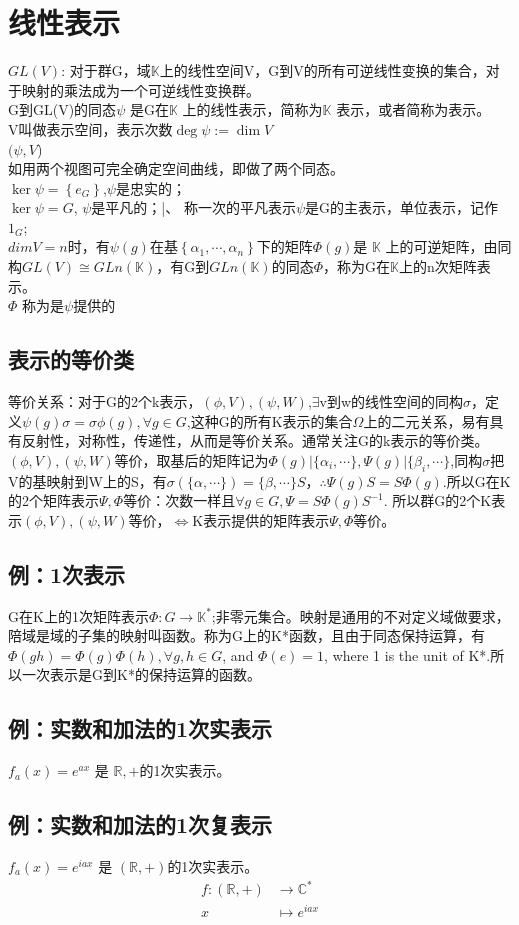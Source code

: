 \documentclass[UTF8]{article}
\begin{document}
\section{线性表示}
$GL(V)$: 对于群G，域$\mathbb K$上的线性空间V，G到V的所有可逆线性变换的集合，对于映射的乘法成为一个可逆线性变换群。\\
G到GL(V)的同态$\psi $ 是G在$\mathbb K$ 上的线性表示，简称为$\mathbb K$ 表示，或者简称为表示。\\
V叫做表示空间，表示次数$\deg \psi := \dim V$\\
$(\psi ,V$)\\
如用两个视图可完全确定空间曲线，即做了两个同态。\\
$\ker \psi =\left\{ e_G \right\}$,$\psi $是忠实的；\\
$\ker \psi =G$, $\psi$是平凡的；|、
称一次的平凡表示$\psi $是G的主表示，单位表示，记作$1_G$;\\
$dimV=n$时，有$\psi (g)$在基$\left\{ \alpha_1,\cdots , \alpha_n \right\}$下的矩阵$\Phi(g)$是 $\mathbb K$ 上的可逆矩阵，由同构$GL(V) \cong GLn(\mathbb K)$，有G到$GLn(\mathbb K)$的同态$\Phi$，称为G在$\mathbb K$上的n次矩阵表示。\\
$\Phi $ 称为是$\psi $提供的
\subsection{表示的等价类}
等价关系：对于G的2个k表示，$(\phi,V),(\psi,W)$,$\exists$v到w的线性空间的同构$\sigma$，定义$\psi(g)\sigma =\sigma \phi (g), \forall g \in G$,这种G的所有K表示的集合$\Omega$上的二元关系，易有具有反射性，对称性，传递性，从而是等价关系。通常关注G的k表示的等价类。\\
$(\phi,V),(\psi,W)$等价，取基后的矩阵记为$\Phi (g)| \{\alpha _i, \cdots\},\Psi (g)| \{\beta _i, \cdots\}$,同构$\sigma$把V的基映射到W上的S，有$\sigma (\{\alpha , \cdots\})=\{\beta, \cdots\}S$，$\therefore \Psi (g)S=S\Phi(g)$.所以G在K的2个矩阵表示$\Psi, \Phi$等价：次数一样且$\forall g \in G,\Psi =S\Phi (g)S^{-1}$. 所以群G的2个K表示$(\phi,V),(\psi,W)$等价，$\Leftrightarrow$K表示提供的矩阵表示$\Psi, \Phi$等价。
\subsection{例：1次表示}
G在K上的1次矩阵表示$\Phi: G \to \mathbb K^*$;非零元集合。映射是通用的不对定义域做要求，陪域是域的子集的映射叫函数。称为G上的K*函数，且由于同态保持运算，有$\Phi (gh)=\Phi (g)\Phi(h), \forall g,h \in G$, and $\Phi(e)=1$, where 1 is the unit of K*.所以一次表示是G到K*的保持运算的函数。

\subsection{例：实数和加法的1次实表示}
$f_a(x)=e^{ax}$ 是 $\mathbb R, +$的1次实表示。

\subsection{例：实数和加法的1次复表示}
$f_a(x)=e^{iax}$ 是 $(\mathbb R, +)$的1次实表示。
\begin{equation}
\label{fubiaohsi}
\begin{split}
f:(\mathbb R, +) &\to \mathbb C^*\\
x  &\mapsto e^{iax}\\
\end{split}
\end{equation}
 
\end{document}

